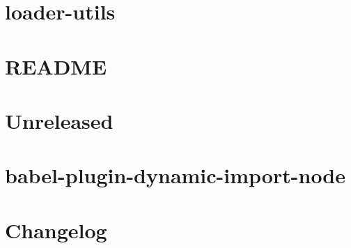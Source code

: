 \documentclass[twoside]{book}
\newcommand{\+}{\discretionary{\mbox{\scriptsize$\hookleftarrow$}}{}{}}
\begin{document}
\chapter{loader-\/utils}
\label{md__c___users_vaishnavi_jadhav__desktop__developer_code_mean_stack_example_client_node_modules_bfbfa9e2ac2590a6f30e9555bb4f0e614}

\chapter{README}
\label{md__c___users_vaishnavi_jadhav__desktop__developer_code_mean_stack_example_client_node_modules_babel_loader__r_e_a_d_m_e}

\chapter{Unreleased}
\label{md__c___users_vaishnavi_jadhav__desktop__developer_code_mean_stack_example_client_node_modules_bbb9274d279c6312edc9f27b2716eea67}

\chapter{babel-\/plugin-\/dynamic-\/import-\/node}
\label{md__c___users_vaishnavi_jadhav__desktop__developer_code_mean_stack_example_client_node_modules_bac5e3a052722bb7279edc2123ced2f6f}

\chapter{Changelog}
\label{md__c___users_vaishnavi_jadhav__desktop__developer_code_mean_stack_example_client_node_modules_b473b5b5bef2cf70d69b8d7dbd5f33d17}

\end{document}
